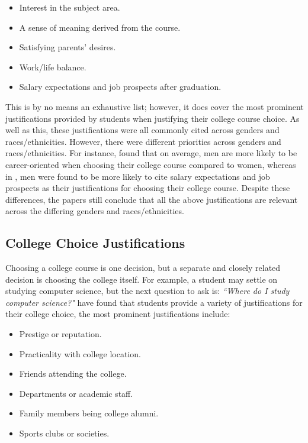 \begin{itemize}
    \item Interest in the subject area.
    \item A sense of meaning derived from the course.
    \item Satisfying parents' desires.
    \item Work/life balance.
    \item Salary expectations and job prospects after graduation.
\end{itemize}

This is by no means an exhaustive list; however, it does cover the most prominent justifications provided by students 
when justifying their college course choice.
As well as this, these justifications were all commonly cited across genders and races/ethnicities.
However, there were different priorities across genders and races/ethnicities.
For instance, \cite{gillis2021choosing} found that on average, men are more likely to be career-oriented 
when choosing their college course compared to women, whereas in \cite{matthews2024students}, men were found to be more likely to cite salary expectations and job prospects
as their justifications for choosing their college course.
Despite these differences,
the papers still conclude that all the above justifications are relevant across the differing genders and races/ethnicities.

\subsection{College Choice Justifications}
\label{sec:college-justifications}

Choosing a college course is one decision, but a separate and closely related decision is choosing the college itself.
For example, a student may settle on studying computer science, but the next question to ask is: \emph{``Where do I study computer science?"}
\cite{oya2015university, cmp2018students, baharun2010institutional} have found that students provide a variety of justifications for their college choice, the most prominent justifications include:

\begin{itemize}
    \item Prestige or reputation.
    \item Practicality with college location.
    \item Friends attending the college.
    \item Departments or academic staff.
    \item Family members being college alumni.
    \item Sports clubs or societies.
\end{itemize}

